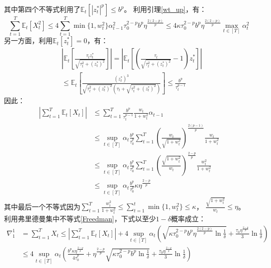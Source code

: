 \documentclass[UTF8,a4paper,10.5pt]{ctexart}
\newcommand{\E}{\mathbb{E}}
\begin{document}
其中第四个不等式利用了$\E_{t}[|z_t^*|^p]\leq b^p$。
利用引理\ref{wt_up}，有：
\begin{equation*}
	\sum_{t=1}^T\E_t[X_t^2]\leq 4\sum_{t=1}^T\min\{1,w_t^2\}\alpha_{t-1}^2 \tau_0^{2-p}b^p \eta^{\frac{2(2-p)}{p}} \leq 4\kappa \tau_0^{2-p}b^p\eta^{\frac{2(2-p)}{p}} \max_{t\in [T]}\alpha_t^2
\end{equation*}
另一方面，利用$\E_t[z_t^*] =0 $，有：
\begin{align*}
	&\left|\E_t\left[\frac{\tau_t z^*_t}{\sqrt{\tau_t^2+(z^*_t)^2}}\right]\right| = \left|\E_t\left[\left(\frac{\tau_t}{\sqrt{\tau_t^2+(z^*_t)^2}}-1\right)z_t^*\right]\right| \\
	&\leq \E_t\left[\frac
	{(z_t^*)^3}{\sqrt{\tau_t^2+(z^*_t)^2}\left(\tau_t+\sqrt{\tau_t^2+(z^*_t)^2}\right)}\right] \leq \frac{b^p}{\tau_t^{p-1}}
\end{align*}
因此：
\begin{align*}
	\left|\sum_{t=1}^T\E_t[X_t]\right| &\leq \sum_{t=1}^T \frac{b^p}{\tau_t^{p-1}}\frac{w_t}{1+w_t^2}\alpha_{t-1} \\
	&\leq \sup_{t\in [T]}\alpha_t \frac{b^p}{\tau_0^p} \sum_{t=1}^T \left(\frac{w_t}{\sqrt{1+w_t^2}}\right)^{\frac{2(p-1)}{p}}\frac{w_t}{1+w_t^2} \\
	& \leq \sup_{t\in [T]}\alpha_t \frac{b^p}{\tau_0^p} \sum_{t=1}^T \left(\frac{\sqrt{1+w_t^2}}{w_t}\right)^{\frac{2-p}{p}}\frac{w_t^2}{1+w_t^2} \\
	& \leq \sup_{t\in [T]}\alpha_t \frac{b^p}{\tau_0^p} \kappa \eta^{\frac{2-p}{p}}
\end{align*}
其中最后一个不等式因为$\sum_{t=1}^T\frac{w_t^2}{1+w_t^2} \leq \sum_{t=1}^{t}\min\{1,w^2_t\}\leq \kappa$， $\frac{\sqrt{1+w_t^2}}{w_t} \leq \eta$。
利用弗里德曼集中不等式\ref{Freedman}，下式以至少$1-\delta$概率成立：
\begin{align*}
	\nabla^1_1 &= \sum_{t=1}^{T}X_t \leq \left|\sum_{t=1}^{T}\E_t[X_t]\right| + 4\sup_{t\in [T]}\alpha_t \left(\sqrt{\kappa \tau_0^{2-p} b^p\eta^{\frac{2(2-p)}{p}} \ln\frac{1}{\delta}} + \frac{\tau_0 \eta^{\frac{2-p}{p}}}{3}\ln\frac{1}{\delta}\right) \\
	&\leq 4\sup_{t\in [T]}\alpha_t \left(\frac{b^p\kappa \eta^{\frac{2-p}{p}}}{4\tau_0^{p}} + \eta^{\frac{2-p}{p}}\sqrt{\kappa \tau_0^{2-p} b^p \ln\frac{1}{\delta}} + \frac{\tau_0 \eta^{\frac{2-p}{p}}}{3}\ln\frac{1}{\delta}\right)
\end{align*}
\end{document}
